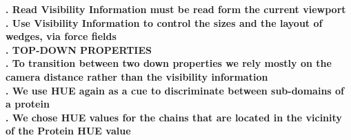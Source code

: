 \documentclass[review,journal]{vgtc}         %
\begin{document}
\textbf{. Read Visibility Information must be read form the current viewport} \\


\textbf{. Use Visibility Information to control the sizes and the layout of wedges, via force fields} \\



\textbf{. TOP-DOWN PROPERTIES} \\

\textbf{. To transition between two down properties we rely mostly on the camera distance rather than the visibility information} \\

\textbf{. We use HUE again as a cue to discriminate between sub-domains of a protein} \\

\textbf{. We chose HUE values for the chains that are located in the vicinity of the Protein HUE value} \\
\end{document}
